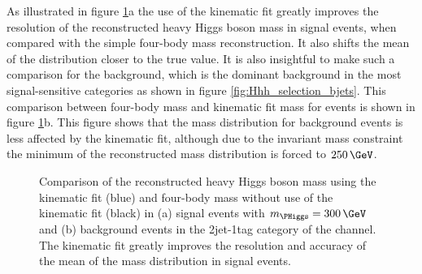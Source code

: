 As illustrated in figure \ref{fig:kinfitvsmjj}a the use of the kinematic fit greatly
improves the resolution of the reconstructed heavy Higgs boson mass in signal events, when 
compared with the simple four-body mass reconstruction. It also shifts the mean of the
distribution closer to the true value. It is also insightful to make such a comparison
for the \ttbar background, which is the dominant background in the most signal-sensitive categories as 
shown in figure \ref{fig:Hhh_selection_bjets}. This comparison between four-body mass and
kinematic fit mass for \ttbar events is shown in figure 
\ref{fig:kinfitvsmjj}b. This figure shows that the mass distribution for
background events is less affected by the kinematic fit, although due to the
invariant mass constraint the minimum of the reconstructed mass distribution
is forced to $250\,\GeV$.

\begin{figure}[h!]
\begin{center}
\end{center}
\caption[Comparison of the reconstructed heavy Higgs boson mass
using the kinematic fit in signal events with $m_{\PHiggs}=300\,\GeV$ and \ttbar 
background events in the 2jet-1tag category of the \mutau channel.]{Comparison of the reconstructed heavy Higgs boson mass using the kinematic fit (blue) and
four-body mass without use of the kinematic fit (black) in (a) signal events with $m_{\PHiggs} = 300\,\GeV$ and (b) \ttbar background events in 
the 2jet-1tag category of the \mutau channel. The kinematic fit greatly improves the resolution and 
accuracy of the mean of the mass distribution in signal events.}
\label{fig:kinfitvsmjj}
\end{figure}


